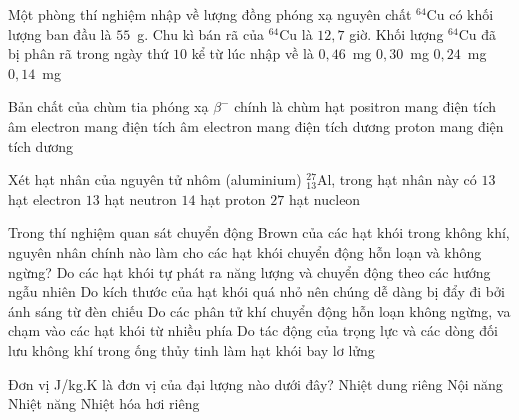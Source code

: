 	\begin{ex}%
		Một phòng thí nghiệm nhập về lượng đồng phóng xạ nguyên chất $^{64}\text{Cu}$ có khối lượng ban đầu là $55$~g. Chu kì bán rã của $^{64}\text{Cu}$ là $12{,}7$ giờ. Khối lượng $^{64}\text{Cu}$ đã bị phân rã trong ngày thứ $10$ kể từ lúc nhập về là
		\choice
		{$0{,}46$~mg}
		{\True $0{,}30$~mg}
		{$0{,}24$~mg}
		{$0{,}14$~mg}
	\end{ex}

	\begin{ex}%
		Bản chất của chùm tia phóng xạ $\beta^-$ chính là chùm hạt
		\choice
		{positron mang điện tích âm}
		{\True electron mang điện tích âm}
		{electron mang điện tích dương}
		{proton mang điện tích dương}
	\end{ex}

	\begin{ex}%
		Xét hạt nhân của nguyên tử nhôm (aluminium) ${}^{27}_{13}\text{Al}$, trong hạt nhân này có
		\choice
		{$13$ hạt electron}
		{$13$ hạt neutron}
		{$14$ hạt proton}
		{\True $27$ hạt nucleon}
	\end{ex}

	\begin{ex}%
		Trong thí nghiệm quan sát chuyển động Brown của các hạt khói trong không khí, nguyên nhân chính nào làm cho các hạt khói chuyển động hỗn loạn và không ngừng?
		\choice
		{Do các hạt khói tự phát ra năng lượng và chuyển động theo các hướng ngẫu nhiên}
		{Do kích thước của hạt khói quá nhỏ nên chúng dễ dàng bị đẩy đi bởi ánh sáng từ đèn chiếu}
		{\True Do các phân tử khí chuyển động hỗn loạn không ngừng, va chạm vào các hạt khói từ nhiều phía}
		{Do tác động của trọng lực và các dòng đối lưu không khí trong ống thủy tinh làm hạt khói bay lơ lửng}
	\end{ex}

	\begin{ex}%
		Đơn vị J/kg.K là đơn vị của đại lượng nào dưới đây?
		\choice
		{\True Nhiệt dung riêng}
		{Nội năng}
		{Nhiệt năng}
		{Nhiệt hóa hơi riêng}
	\end{ex}

